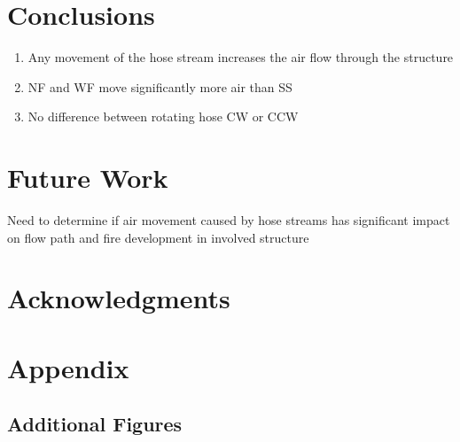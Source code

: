 \documentclass[12pt,oneside]{book}
\begin{document}
\chapter{Conclusions}
\label{chap:Conclusions}
\begin{enumerate}
\item Any movement of the hose stream increases the air flow through the structure
\item NF and WF move significantly more air than SS
\item No difference between rotating hose CW or CCW
\end{enumerate}

\chapter{Future Work}
\label{chap:Future_Work}
Need to determine if air movement caused by hose streams has significant impact on flow path and fire development in involved structure

\chapter{Acknowledgments}
\label{chap:acknowledgments}



\appendix
\chapter{Appendix}
\label{chap:appendix}

\section{Additional Figures}
\label{sec:additional_figures}

\clearpage
\end{document}
